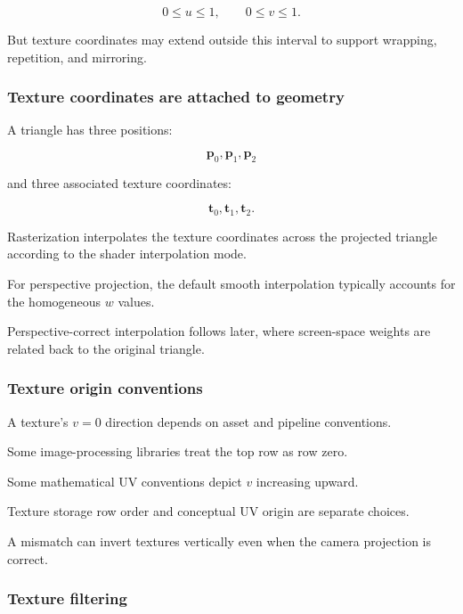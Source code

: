 \[
 0\le u\le1,\qquad0\le v\le1.
\]

But texture coordinates may extend outside this interval to support wrapping, repetition, and mirroring.

\subsubsection{Texture coordinates are attached to geometry}\label{02-foundations-ii-ch032-texture-coordinates-are-attached-to-geometry}

\hypertarget{02-foundations-ii-ch032-texture-coordinates-are-attached-to-geometry}{}

A triangle has three positions:

\[
 \mathbf p_0,\mathbf p_1,\mathbf p_2
\]

and three associated texture coordinates:

\[
 \mathbf t_0,\mathbf t_1,\mathbf t_2.
\]

Rasterization interpolates the texture coordinates across the projected triangle according to the shader interpolation mode.

For perspective projection, the default smooth interpolation typically accounts for the homogeneous \(w\) values.

Perspective-correct interpolation follows later, where screen-space weights are related back to the original triangle.

\subsubsection{Texture origin conventions}\label{02-foundations-ii-ch032-texture-origin-conventions}

\hypertarget{02-foundations-ii-ch032-texture-origin-conventions}{}

A texture's \(v=0\) direction depends on asset and pipeline conventions.

Some image-processing libraries treat the top row as row zero.

Some mathematical UV conventions depict \(v\) increasing upward.

Texture storage row order and conceptual UV origin are separate choices.

A mismatch can invert textures vertically even when the camera projection is correct.

\subsubsection{Texture filtering}\label{02-foundations-ii-ch032-texture-filtering}

